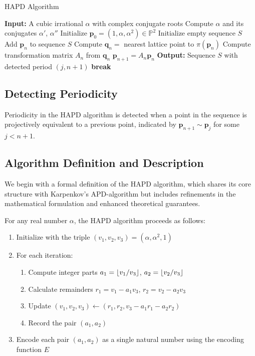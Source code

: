 \begin{algorithm}[H]
\caption{HAPD Algorithm}
\begin{algorithmic}[1]
\State \textbf{Input:} A cubic irrational $\alpha$ with complex conjugate roots
\State Compute $\alpha$ and its conjugates $\alpha'$, $\alpha''$
\State Initialize $\mathbf{p}_0 = (1, \alpha, \alpha^2) \in \mathbb{P}^2$
\State Initialize empty sequence $S$
    \State Add $\mathbf{p}_n$ to sequence $S$
    \State Compute $\mathbf{q}_n = $ nearest lattice point to $\pi(\mathbf{p}_n)$
    \State Compute transformation matrix $A_n$ from $\mathbf{q}_n$
    \State $\mathbf{p}_{n+1} = A_n \mathbf{p}_n$
        \State \textbf{Output:} Sequence $S$ with detected period $(j, n+1)$
        \State \textbf{break}
    \EndIf
\EndFor
\end{algorithmic}
\end{algorithm}

\subsection{Detecting Periodicity}

Periodicity in the HAPD algorithm is detected when a point in the sequence is projectively equivalent to a previous point, indicated by $\mathbf{p}_{n+1} \sim \mathbf{p}_j$ for some $j < n+1$.

\subsection{Algorithm Definition and Description}

We begin with a formal definition of the HAPD algorithm, which shares its core structure with Karpenkov's APD-algorithm but includes refinements in the mathematical formulation and enhanced theoretical guarantees.

\begin{algorithm_def}\label{alg:hapd}
For any real number $\alpha$, the HAPD algorithm proceeds as follows:
\begin{enumerate}
    \item Initialize with the triple $(v_1, v_2, v_3) = (\alpha, \alpha^2, 1)$
    \item For each iteration:
    \begin{enumerate}
        \item Compute integer parts $a_1 = \lfloor v_1/v_3 \rfloor$, $a_2 = \lfloor v_2/v_3 \rfloor$
        \item Calculate remainders $r_1 = v_1 - a_1v_3$, $r_2 = v_2 - a_2v_3$
        \item Update $(v_1, v_2, v_3) \leftarrow (r_1, r_2, v_3 - a_1r_1 - a_2r_2)$
        \item Record the pair $(a_1, a_2)$
    \end{enumerate}
    \item Encode each pair $(a_1, a_2)$ as a single natural number using the encoding function $E$
\end{enumerate}
\end{algorithm_def}

